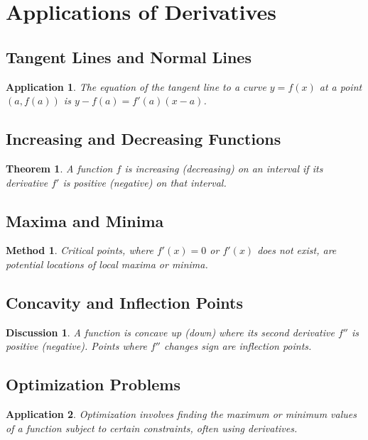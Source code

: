 \documentclass[a4paper,12pt]{book}
\newtheorem{theorem}{Theorem}
\newtheorem{application}{Application}
\newtheorem{method}{Method}
\newtheorem{discussion}{Discussion}
\begin{document}
\section{Applications of Derivatives}
\subsection{Tangent Lines and Normal Lines}
\begin{application}
The equation of the tangent line to a curve \( y = f(x) \) at a point \( (a, f(a)) \) is \( y - f(a) = f'(a)(x - a) \).
\end{application}

\subsection{Increasing and Decreasing Functions}
\begin{theorem}
A function \( f \) is increasing (decreasing) on an interval if its derivative \( f' \) is positive (negative) on that interval.
\end{theorem}

\subsection{Maxima and Minima}
\begin{method}
Critical points, where \( f'(x) = 0 \) or \( f'(x) \) does not exist, are potential locations of local maxima or minima.
\end{method}

\subsection{Concavity and Inflection Points}
\begin{discussion}
A function is concave up (down) where its second derivative \( f'' \) is positive (negative). Points where \( f'' \) changes sign are inflection points.
\end{discussion}

\subsection{Optimization Problems}
\begin{application}
Optimization involves finding the maximum or minimum values of a function subject to certain constraints, often using derivatives.
\end{application}
\end{document}
